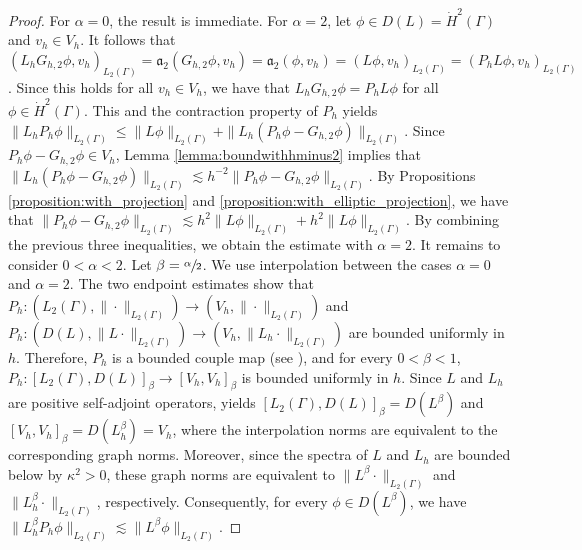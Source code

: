 \documentclass[numbers,webpdf]{ima-authoring-template}%
\theoremstyle{thmstyletwo}%
\numberwithin{equation}{section}
\begin{document}
\begin{proof}
     For $\alpha = 0$, the result is immediate. For $\alpha = 2$, let $\phi\in D(L) = \dot{H}^2(\Gamma)$ and $v_h\in V_h$. It follows that $(L_hG_{h,2}\phi,v_h)_{L_2(\Gamma)} = \mathfrak{a}_{2}(G_{h,2}\phi,v_h)  = \mathfrak{a}_{2}(\phi,v_h)  = (L\phi,v_h)_{L_2(\Gamma)} = (P_hL\phi,v_h)_{L_2(\Gamma)}$. Since this holds for all $v_h\in V_h$, we have that $L_hG_{h,2}\phi = P_hL\phi$ for all $\phi\in \dot{H}^2(\Gamma)$. This and the contraction property of $P_h$ yields $\|L_hP_h\phi\|_{L_2(\Gamma)} \leq \|L\phi\|_{L_2(\Gamma)}  +  \|L_h(P_h\phi - G_{h,2}\phi)\|_{L_2(\Gamma)}$. Since $P_h\phi - G_{h,2}\phi\in V_h$, Lemma \ref{lemma:boundwithhminus2} implies that $\|L_h(P_h\phi - G_{h,2}\phi)\|_{L_2(\Gamma)}  \lesssim h^{-2}\|P_h\phi - G_{h,2}\phi\|_{L_2(\Gamma)}$. By Propositions \ref{proposition:with_projection} and \ref{proposition:with_elliptic_projection}, we have that $\|P_h\phi - G_{h,2}\phi\|_{L_2(\Gamma)}  \lesssim h^2\|L\phi\|_{L_2(\Gamma)} + h^2\|L\phi\|_{L_2(\Gamma)}$. By combining the previous three inequalities, we obtain the estimate with $\alpha=2$. It remains to consider $0<\alpha<2$. Let $\beta=\sfrac{\alpha}{2}$. We use interpolation between the cases $\alpha=0$ and $\alpha=2$. The two endpoint estimates show that $P_h:(L_2(\Gamma),\|\cdot\|_{L_2(\Gamma)})\to (V_h,\|\cdot\|_{L_2(\Gamma)})$ and $P_h:(D(L),\|L\cdot\|_{L_2(\Gamma)})\to (V_h,\|L_h\cdot\|_{L_2(\Gamma)})$ are bounded uniformly in $h$. Therefore, $P_h$ is a bounded couple map (see \cite{ChandlerWilde2015interpolation}), and for every $0<\beta<1$, $P_h:[L_2(\Gamma),D(L)]_\beta\to[V_h,V_h]_\beta$ is bounded uniformly in $h$. Since $L$ and $L_h$ are positive self-adjoint operators, \cite[Theorem~4.36]{Lunardi2018Interpolation} yields $[L_2(\Gamma),D(L)]_\beta=D(L^\beta)$ and $[V_h,V_h]_\beta=D(L_h^\beta)=V_h$, where the interpolation norms are equivalent to the corresponding graph norms. Moreover, since the spectra of $L$ and $L_h$ are bounded below by $\kappa^2>0$, these graph norms are equivalent to $\|L^\beta\cdot\|_{L_2(\Gamma)}$ and $\|L_h^\beta\cdot\|_{L_2(\Gamma)}$, respectively. Consequently, for every $\phi\in D(L^\beta)$, we have $\|L_h^\beta P_h\phi\|_{L_2(\Gamma)}\lesssim\|L^\beta\phi\|_{L_2(\Gamma)}$. %
     \hfill
    \end{proof}

        
            
\end{document}

